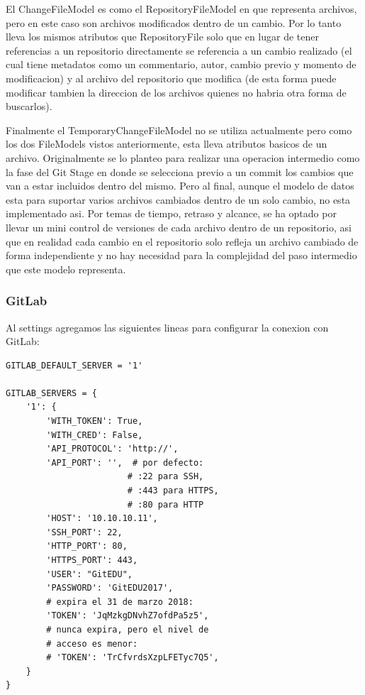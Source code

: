 El ChangeFileModel es como el RepositoryFileModel en que representa archivos, pero en este caso son archivos modificados dentro de un cambio. Por lo tanto lleva los mismos atributos que RepositoryFile solo que en lugar de tener referencias a un repositorio directamente se referencia a un cambio realizado (el cual tiene metadatos como un commentario, autor, cambio previo y momento de modificacion) y al archivo del repositorio que modifica (de esta forma puede modificar tambien la direccion de los archivos quienes no habria otra forma de buscarlos).

Finalmente el TemporaryChangeFileModel no se utiliza actualmente pero como los dos FileModels vistos anteriormente, esta lleva atributos basicos de un archivo. Originalmente se lo planteo para realizar una operacion intermedio como la fase del Git Stage en donde se selecciona previo a un commit los cambios que van a estar incluidos dentro del mismo. Pero al final, aunque el modelo de datos esta para suportar varios archivos cambiados dentro de un solo cambio, no esta implementado asi. Por temas de tiempo, retraso y alcance, se ha optado por llevar un mini control de versiones de cada archivo dentro de un repositorio, asi que en realidad cada cambio en el repositorio solo refleja un archivo cambiado de forma independiente y no hay necesidad para la complejidad del paso intermedio que este modelo representa. 

\subsubsection{GitLab}
Al settings agregamos las siguientes lineas para configurar la conexion con GitLab:
\lstset{language=Python}
\begin{lstlisting}
GITLAB_DEFAULT_SERVER = '1'

GITLAB_SERVERS = {
    '1': {
        'WITH_TOKEN': True,
        'WITH_CRED': False,
        'API_PROTOCOL': 'http://',
        'API_PORT': '',  # por defecto:
                        # :22 para SSH,
                        # :443 para HTTPS,
                        # :80 para HTTP
        'HOST': '10.10.10.11',
        'SSH_PORT': 22,
        'HTTP_PORT': 80,
        'HTTPS_PORT': 443,
        'USER': "GitEDU",
        'PASSWORD': 'GitEDU2017',
        # expira el 31 de marzo 2018:
        'TOKEN': 'JqMzkgDNvhZ7ofdPa5z5',
        # nunca expira, pero el nivel de 
        # acceso es menor:
        # 'TOKEN': 'TrCfvrdsXzpLFETyc7Q5',  
    }
}
\end{lstlisting}
\lstset{language=Bash}

